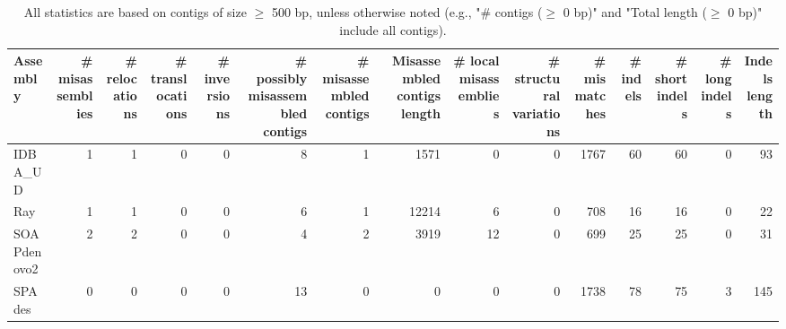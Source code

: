 \documentclass[12pt,a4paper]{article}
\begin{document}
\begin{table}[ht]
\begin{center}
\caption{All statistics are based on contigs of size $\geq$ 500 bp, unless otherwise noted (e.g., "\# contigs ($\geq$ 0 bp)" and "Total length ($\geq$ 0 bp)" include all contigs).}
\begin{tabular}{|l*{14}{|r}|}
\hline
Assembly & \# misassemblies &     \# relocations &     \# translocations &     \# inversions & \# possibly misassembled contigs & \# misassembled contigs & Misassembled contigs length & \# local misassemblies & \# structural variations & \# mismatches & \# indels &     \# short indels &     \# long indels & Indels length \\ \hline
IDBA\_UD & 1 & 1 & 0 & 0 & 8 & 1 & 1571 & 0 & 0 & 1767 & 60 & 60 & 0 & 93 \\ \hline
Ray & 1 & 1 & 0 & 0 & 6 & 1 & 12214 & 6 & 0 & 708 & 16 & 16 & 0 & 22 \\ \hline
SOAPdenovo2 & 2 & 2 & 0 & 0 & 4 & 2 & 3919 & 12 & 0 & 699 & 25 & 25 & 0 & 31 \\ \hline
SPAdes & 0 & 0 & 0 & 0 & 13 & 0 & 0 & 0 & 0 & 1738 & 78 & 75 & 3 & 145 \\ \hline
\end{tabular}
\end{center}
\end{table}
\end{document}

